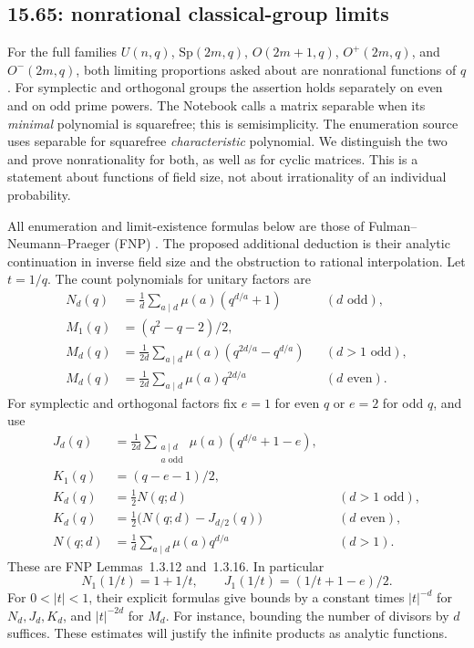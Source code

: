 \subsection{15.65: nonrational classical-group limits}
\label{cand:15.65}
For the full families \(U(n,q)\), \(\mathrm{Sp}(2m,q)\),
\(O(2m+1,q)\), \(O^+(2m,q)\), and \(O^-(2m,q)\), both limiting
proportions asked about are nonrational functions of \(q\).
For symplectic and orthogonal groups the assertion holds separately
on even and on odd prime powers.
The Notebook calls a matrix separable when its \emph{minimal}
polynomial is squarefree; this is semisimplicity.
The enumeration source uses separable for squarefree
\emph{characteristic} polynomial. We distinguish the two and prove
nonrationality for both, as well as for cyclic matrices.
This is a statement about functions of field size, not about
irrationality of an individual probability.

All enumeration and limit-existence formulas below are those of
Fulman--Neumann--Praeger (FNP) \cite{fnp}.
The proposed additional deduction is their analytic continuation
in inverse field size and the obstruction to rational interpolation.
Let \(t=1/q\). The count polynomials for unitary factors are
\[
\begin{aligned}
 N_d(q)&=\frac1d\sum_{a\mid d}\mu(a)(q^{d/a}+1)
                       &&(d\text{ odd}),\\
 M_1(q)&=(q^2-q-2)/2,\\
 M_d(q)&=\frac1{2d}\sum_{a\mid d}\mu(a)(q^{2d/a}-q^{d/a})
                       &&(d>1\text{ odd}),\\
 M_d(q)&=\frac1{2d}\sum_{a\mid d}\mu(a)q^{2d/a}
                       &&(d\text{ even}).
\end{aligned}
\]
For symplectic and orthogonal factors fix \(e=1\) for even \(q\)
or \(e=2\) for odd \(q\), and use
\[
\begin{aligned}
 J_d(q)&=\frac1{2d}\sum_{\substack{a\mid d\\a\text{ odd}}}
                  \mu(a)(q^{d/a}+1-e),\\
 K_1(q)&=(q-e-1)/2,\\
 K_d(q)&=\tfrac12 N(q;d)&& (d>1\text{ odd}),\\
 K_d(q)&=\tfrac12\bigl(N(q;d)-J_{d/2}(q)\bigr)&& (d\text{ even}),\\
 N(q;d)&=\frac1d\sum_{a\mid d}\mu(a)q^{d/a}&& (d>1).
\end{aligned}
\]
These are FNP Lemmas~1.3.12 and~1.3.16. In particular
\[
 N_1(1/t)=1+1/t,\qquad J_1(1/t)=(1/t+1-e)/2.
\]
For \(0<|t|<1\), their explicit formulas give bounds by a constant
times \(|t|^{-d}\) for \(N_d,J_d,K_d\), and \(|t|^{-2d}\) for \(M_d\).
For instance, bounding the number of divisors by \(d\) suffices.
These estimates will justify the infinite products as analytic functions.

